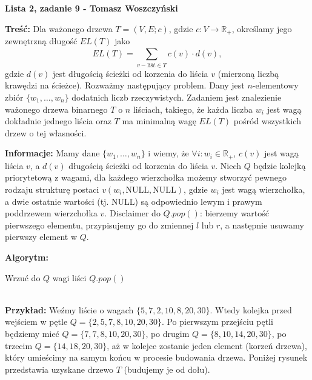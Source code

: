 \documentclass[a4paper,12pt]{article}
\begin{document}
\noindent \textbf{Lista 2, zadanie 9 - Tomasz Woszczyński}\newline

\noindent \newline \textbf{Treść:} Dla ważonego drzewa $T = (V, E; c)$, gdzie $c: V \to \mathbb{R}_{+}$, określamy jego zewnętrzną długość $EL(T)$ jako
$$ EL(T)= \sum\limits_{v-\text{liść}\in T}^{} c(v) \cdot d(v), $$ 
gdzie $d(v)$ jest długością ścieżki od korzenia do liścia $v$ (mierzoną liczbą krawędzi na ścieżce). Rozważmy następujący problem. Dany jest $n$-elementowy zbiór $\{ w_1, \dots, w_n \}$ dodatnich liczb rzeczywistych. Zadaniem jest znalezienie ważonego drzewa binarnego $T$ o $n$ liściach, takiego, że każda liczba $w_i$ jest wagą dokładnie jednego liścia oraz $T$ ma minimalną wagę $EL(T)$ pośród wszystkich drzew o tej własności. \newline

\noindent \textbf{Informacje:}  Mamy dane  $\{ w_1, \dots, w_n \}$ i wiemy, że $\forall i: w_i \in \mathbb{R}_{+}$, $c(v)$ jest wagą liścia $v$, a $d(v)$ długością ścieżki od korzenia do liścia $v$. Niech $Q$ będzie kolejką priorytetową z wagami, dla każdego wierzchołka możemy stworzyć pewnego rodzaju strukturę postaci $v(w_i, \text{NULL}, \text{NULL})$, gdzie $w_i$ jest wagą wierzchołka, a dwie ostatnie wartości (tj. NULL) są odpowiednio lewym i prawym poddrzewem wierzchołka $v$. Disclaimer do $Q.pop()$: bierzemy wartość pierwszego elementu, przypisujemy go do zmiennej $l$ lub $r$, a następnie usuwamy pierwszy element w $Q$.\newline

\noindent \textbf{Algorytm:} \newline
\begin{algorithm}[H]
	Wrzuć do $Q$ wagi liści\;  
	\Return $Q.pop()$\;
\end{algorithm} 

~\\ \noindent \textbf{Przykład:} Weźmy liście o wagach $\{ 5, 7, 2, 10, 8, 20, 30\}$. Wtedy kolejka przed wejściem w pętle $Q = \{ 2, 5, 7, 8, 10, 20, 30 \}$. Po pierwszym przejściu pętli będziemy mieć $Q = \{ 7, 7, 8, 10, 20, 30 \}$, po drugim $Q = \{8, 10, 14, 20, 30 \}$, po trzecim $Q = \{ 14, 18, 20, 30 \}$, aż w kolejce zostanie jeden element (korzeń drzewa), który umieścimy na samym końcu w procesie budowania drzewa. Poniżej rysunek przedstawia uzyskane drzewo $T$ (budujemy je od dołu).
\end{document}
